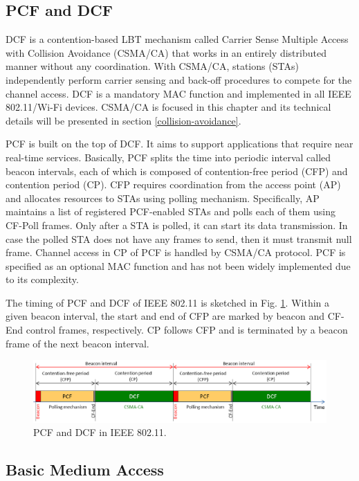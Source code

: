\subsection{PCF and DCF}
\label{pcf-dcf}

DCF is a contention-based LBT mechanism called Carrier Sense Multiple Access with Collision Avoidance (CSMA/CA) that works in an entirely distributed manner without any coordination. With CSMA/CA, stations (STAs) independently perform carrier sensing and back-off procedures to compete for the channel access. DCF is a mandatory MAC function and implemented in all IEEE 802.11/Wi-Fi devices. CSMA/CA is focused in this chapter and its technical details will be presented in section \ref{collision-avoidance}.

PCF is built on the top of DCF. It aims to support applications that require near real-time services. Basically, PCF splits the time into periodic interval called beacon intervals, each of which is composed of contention-free period (CFP) and contention period (CP). CFP requires coordination from the access point (AP) and allocates resources to STAs using polling mechanism. Specifically, AP maintains a list of registered PCF-enabled STAs and polls each of them using CF-Poll frames. Only after a STA is polled, it can start its data transmission. In case the polled STA does not have any frames to send, then it must transmit null frame. Channel access in CP of PCF is handled by CSMA/CA protocol. PCF is specified as an optional MAC function and has not been widely implemented due to its complexity.

The timing of PCF and DCF of IEEE 802.11 is sketched in Fig. \ref{figs:802-11-PCF-DCF}. Within a given beacon interval, the start and end of CFP are marked by beacon and CF-End control frames, respectively. CP follows CFP and is terminated by a beacon frame of the next beacon interval. 


\begin{figure}[!t]
	\centering
	\includegraphics[width=1.0\columnwidth]{figs/802-11-PCF-DCF}
	\caption{PCF and DCF in IEEE 802.11.}
	\label{figs:802-11-PCF-DCF}
\end{figure}

\subsection{Basic Medium Access}
\label{basic-medium-access}

